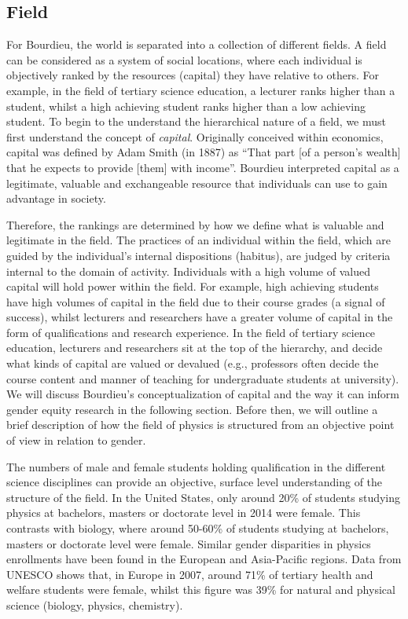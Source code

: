 \subsection{Field}
For Bourdieu, the world is separated into a collection of different fields.\cite{Bourdieu1984} A field can be considered as a system of social locations, where each individual is objectively ranked by the resources (capital) they have relative to others. For example, in the field of tertiary science education, a lecturer ranks higher than a student, whilst a high achieving student ranks higher than a low achieving student. To begin to the understand the hierarchical nature of a field, we must first understand the concept of \textit{capital}. Originally conceived within economics, capital was defined by Adam Smith (in 1887) as ``That part [of a person's wealth] that he expects to provide [them] with \textellipsis income\textellipsis''.\cite{Smith_1887} Bourdieu interpreted capital as a legitimate, valuable and exchangeable resource that individuals can use to gain advantage in society.\cite{Bourdieu_1986}

Therefore, the rankings are determined by how we define what is valuable and legitimate in the field. The practices of an individual within the field, which are guided by the individual's internal dispositions (habitus), are judged by criteria internal to the domain of activity.\cite{hilgers2014introduction} Individuals with a high volume of valued capital will hold power within the field. For example, high achieving students have high volumes of capital in the field due to their course grades (a signal of success), whilst lecturers and researchers have a greater volume of capital in the form of qualifications and research experience. In the field of tertiary science education, lecturers and researchers sit at the top of the hierarchy, and decide what kinds of capital are valued or devalued (e.g., professors often decide the course content and manner of teaching for undergraduate students at university). We will discuss Bourdieu's conceptualization of capital and the way it can inform gender equity research in the following section. Before then, we will outline a brief description of how the field of physics is structured from an objective point of view in relation to gender.

The numbers of male and female students holding qualification in the different science disciplines can provide an objective, surface level understanding of the structure of the field. In the United States, only around 20\% of students studying physics at bachelors, masters or doctorate level in 2014 were female.\cite{NSF} This contrasts with biology, where around 50-60\% of students studying at bachelors, masters or doctorate level were female.\cite{NSF} Similar gender disparities in physics enrollments have been found in the European\cite{InstituteofPhysics_2012,InstituteofPhysics_2013, Stevanovic_2013} and Asia-Pacific regions.\cite{Abraham_2014, Kennedy_2014} Data from UNESCO  shows that, in Europe in 2007, around 71\% of tertiary health and welfare students were female, whilst this figure was 39\% for natural and physical science (biology, physics, chemistry).\cite{Huyer2007} 

